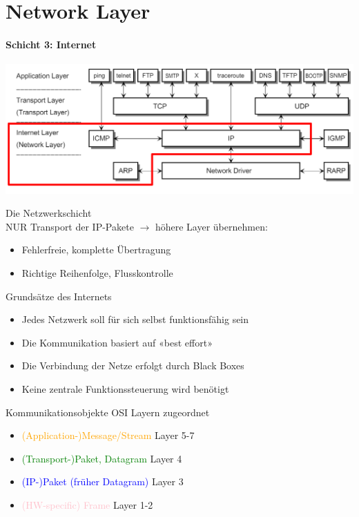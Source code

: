 \section{Network Layer}
\paragraph{Schicht 3: Internet}

\includegraphics[width=1\linewidth]{images/orientierung_network_layer.png}

\begin{definition}{Die Netzwerkschicht}\\
    NUR Transport der IP-Pakete $\rightarrow$ höhere Layer übernehmen:
        \begin{itemize}
            \item Fehlerfreie, komplette Übertragung
            \item Richtige Reihenfolge, Flusskontrolle
        \end{itemize}
\end{definition}

\begin{lemma}{Grundsätze des Internets}
    \begin{itemize}
        \item Jedes Netzwerk soll für sich selbst funktionsfähig sein
        \item Die Kommunikation basiert auf «best effort»
        \item Die Verbindung der Netze erfolgt durch Black Boxes
        \item Keine zentrale Funktionssteuerung wird benötigt
    \end{itemize}
\end{lemma}

\begin{definition}{Kommunikationsobjekte} OSI Layern zugeordnet
       \begin{itemize}
        \item \textcolor{orange}{(Application-)Message/Stream} Layer 5-7
        \item \textcolor{green}{(Transport-)Paket, Datagram} Layer 4
        \item \textcolor{blue}{(IP-)Paket (früher Datagram)} Layer 3
        \item \textcolor{pink}{(HW-specific) Frame} Layer 1-2
    \end{itemize}
\end{definition}



